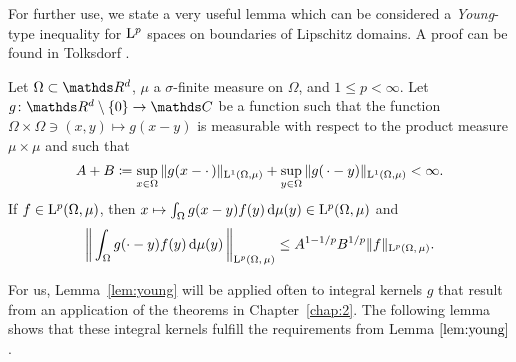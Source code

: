 
For further use, we state a very useful lemma which can be considered a \emph{Young}-type inequality for $\mathrm{L}^p$ spaces on boundaries of Lipschitz domains.
A proof can be found in Tolksdorf \cite[Prop.\@~1.1.4]{tolksdorf}.

\begin{lem}
  \label{lem:young}
  Let $\Omega \subset \R^d$, $\mu$ a $\sigma$-finite measure on $\Omega$, and $1 \leq p < \infty$.
  Let $g \colon \R^d \setminus \{ 0\} \to \C$ be a function such that the function $\Omega \times \Omega \ni (x, y) \mapsto g(x-y)$ is measurable with respect to the product measure $\mu \times \mu$ and such that
  \begin{align*}
    A + B \coloneqq \sup_{x \in \Omega} \| g(x - \cdot\,) \|_{\mathrm{L}^1(\Omega, \mu)} + \sup_{y \in \Omega} \|g(\,\cdot - y) \|_{\mathrm{L}^1(\Omega, \mu)} < \infty.
  \end{align*}
  If $f \in \mathrm{L}^p(\Omega, \mu)$, then $x \mapsto \int_\Omega g(x - y) f(y) \, {\operatorname{d}\!{\mu}}(y) \in \mathrm{L}^p(\Omega, \mu)$ and
  \begin{align*}
    \bigg\| \int_\Omega g(\cdot - y) f(y) \, {\operatorname{d}\!{\mu}}(y)\, \bigg\|_{\mathrm{L}^p(\Omega, \,\mu)} \leq A^{1 - 1/p} B^{1/p} \|f\|_{\mathrm{L}^p(\Omega, \,\mu)}.
  \end{align*}
\end{lem}

For us, Lemma~\ref{lem:young} will be applied often to integral kernels $g$ that result from an application of the theorems in Chapter~\ref{chap:2}.
The following lemma shows that these integral kernels fulfill the requirements from Lemma $\ref{lem:young}$.


